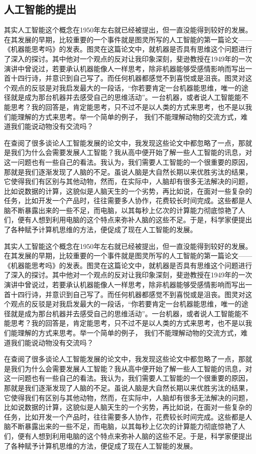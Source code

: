 \documentclass[UTF8]{XJTUthesis}
\begin{document}
\subsection{人工智能的提出}
其实人工智能这个概念在1950年左右就已经被提出，但一直没能得到较好的发展。在其发展的早期，比较重要的一个事件就是图灵所写的人工智能的第一篇论文——《机器能思考吗》的发表。图灵在这篇论文中，就机器是否具有思维这个问题进行了深入的探讨。其中他对一个观点的反对让我印象深刻，斐逊教授在1949年的一次演讲中曾说过，若要承认机器能像人一样思考，除非机器能够受感情影响而写出一首十四行诗，并意识到自己写了。而任何机器都感觉不到喜悦或是沮丧。图灵对这个观点的反驳是对我启发最大的一段话，“你若要肯定一台机器能思维，唯一的途径就是成为那台机器并去感受自己的思维活动”。一台机器，或者说人工智能能不能思考？我的回答是，肯定能思考，只不过不是以人类的方式来思考，也不是以我们能理解的方式来思考。举一个简单的例子， 我们不能理解动物的交流方式，难道我们能说动物没有交流吗？\par
在查阅了很多谈论人工智能发展的论文中，我发现这些论文中都忽略了一点，那就是我们为什么会需要发展人工智能？我从高中便开始了解一些人工智能的讯息，对这一问题也有一些自己的看法。我认为，我们需要人工智能的一个很重要的原因，那就是我们逐渐发现了人脑的不足。虽说人脑是大自然长期以来优胜劣汰的结果，它使得我们有区别与其他动物，然而，在实际中，人脑却有很多无法解决的问题，比如说数据的计算，这貌似是人脑天生的一个劣势，再比如说，在面对一些复杂的任务，比如开发一个产品时，往往需要多人协作，花费较长时间完成。这些都是人脑不断暴露出来的一些不足，而电脑，以其每秒上亿次的计算能力彻底惊艳了人们，便有人想到利用电脑的这个特点来弥补人脑的这些不足。于是，科学家便提出了各种赋予计算机思维的方法，便促成了现在人工智能的发展。\par
其实人工智能这个概念在1950年左右就已经被提出，但一直没能得到较好的发展。在其发展的早期，比较重要的一个事件就是图灵所写的人工智能的第一篇论文——《机器能思考吗》的发表。图灵在这篇论文中，就机器是否具有思维这个问题进行了深入的探讨。其中他对一个观点的反对让我印象深刻，斐逊教授在1949年的一次演讲中曾说过，若要承认机器能像人一样思考，除非机器能够受感情影响而写出一首十四行诗，并意识到自己写了。而任何机器都感觉不到喜悦或是沮丧。图灵对这个观点的反驳是对我启发最大的一段话，“你若要肯定一台机器能思维，唯一的途径就是成为那台机器并去感受自己的思维活动”。一台机器，或者说人工智能能不能思考？我的回答是，肯定能思考，只不过不是以人类的方式来思考，也不是以我们能理解的方式来思考。举一个简单的例子， 我们不能理解动物的交流方式，难道我们能说动物没有交流吗？\par
在查阅了很多谈论人工智能发展的论文中，我发现这些论文中都忽略了一点，那就是我们为什么会需要发展人工智能？我从高中便开始了解一些人工智能的讯息，对这一问题也有一些自己的看法。我认为，我们需要人工智能的一个很重要的原因，那就是我们逐渐发现了人脑的不足。虽说人脑是大自然长期以来优胜劣汰的结果，它使得我们有区别与其他动物，然而，在实际中，人脑却有很多无法解决的问题，比如说数据的计算，这貌似是人脑天生的一个劣势，再比如说，在面对一些复杂的任务，比如开发一个产品时，往往需要多人协作，花费较长时间完成。这些都是人脑不断暴露出来的一些不足，而电脑，以其每秒上亿次的计算能力彻底惊艳了人们，便有人想到利用电脑的这个特点来弥补人脑的这些不足。于是，科学家便提出了各种赋予计算机思维的方法，便促成了现在人工智能的发展。\par
\end{document}
